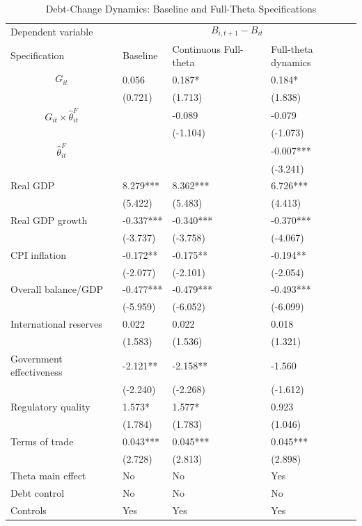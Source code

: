 \begin{table}[H]\centering
\begin{threeparttable}
\caption{Debt-Change Dynamics: Baseline and Full-Theta Specifications}
\label{tab:debt_change_combined_fulltheta}
\scriptsize
\begin{tabularx}{\textwidth}{lYYY}
\toprule
Dependent variable &  \\
\cmidrule(lr){2-4}
Specification & Baseline & Continuous Full-theta & Full-theta dynamics \\
\midrule
$$G_{it}$$ & 0.056 & 0.187* & 0.184* \\
 & (0.721) & (1.713) & (1.838) \\
$$G_{it}\times\widehat{\theta}^{F}_{it}$$ &  & -0.089 & -0.079 \\
 &  & (-1.104) & (-1.073) \\
$$\widehat{\theta}^{F}_{it}$$ &  &  & -0.007*** \\
 &  &  & (-3.241) \\
Real GDP & 8.279*** & 8.362*** & 6.726*** \\
 & (5.422) & (5.483) & (4.413) \\
Real GDP growth & -0.337*** & -0.340*** & -0.370*** \\
 & (-3.737) & (-3.758) & (-4.067) \\
CPI inflation & -0.172** & -0.175** & -0.194** \\
 & (-2.077) & (-2.101) & (-2.054) \\
Overall balance/GDP & -0.477*** & -0.479*** & -0.493*** \\
 & (-5.959) & (-6.052) & (-6.099) \\
International reserves & 0.022 & 0.022 & 0.018 \\
 & (1.583) & (1.536) & (1.321) \\
Government effectiveness & -2.121** & -2.158** & -1.560 \\
 & (-2.240) & (-2.268) & (-1.612) \\
Regulatory quality & 1.573* & 1.577* & 0.923 \\
 & (1.784) & (1.783) & (1.046) \\
Terms of trade & 0.043*** & 0.045*** & 0.045*** \\
 & (2.728) & (2.813) & (2.898) \\
\midrule
Theta main effect & No & No & Yes \\
Debt control & No & No & No \\
Controls & Yes & Yes & Yes \\

\end{tabularx}
\end{threeparttable}
\end{table}
